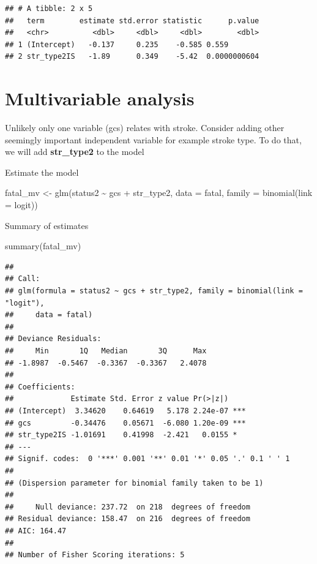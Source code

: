 \documentclass[
]{book}
\makeatletter
\newenvironment{Shaded}{\begin{snugshade}}{\end{snugshade}}
\newcommand{\AttributeTok}[1]{\textcolor[rgb]{0.61,0.61,0.61}{#1}}
\newcommand{\FunctionTok}[1]{\textcolor[rgb]{0,0,0}{#1}}
\newcommand{\NormalTok}[1]{#1}
\newcommand{\OtherTok}[1]{\textcolor[rgb]{0.37,0.37,0.37}{#1}}
\newcommand{\SpecialCharTok}[1]{\textcolor[rgb]{0,0,0}{#1}}
\newcommand{\StringTok}[1]{\textcolor[rgb]{0.5,0.5,0.5}{#1}}
\newenvironment{kframe}{%
\medskip{}
\setlength{\fboxsep}{.8em}
 \def\at@end@of@kframe{}%
 \ifinner\ifhmode%
  \def\at@end@of@kframe{\end{minipage}}%
  \begin{minipage}{\columnwidth}%
 \fi\fi%
 \def\FrameCommand##1{\hskip\@totalleftmargin \hskip-\fboxsep
 \colorbox{shadecolor}{##1}\hskip-\fboxsep
     \hskip-\linewidth \hskip-\@totalleftmargin \hskip\columnwidth}%
 \MakeFramed {\advance\hsize-\width
   \@totalleftmargin\z@ \linewidth\hsize
   \@setminipage}}%
 {\par\unskip\endMakeFramed%
 \at@end@of@kframe}
\renewenvironment{Shaded}{\begin{kframe}}{\end{kframe}}
\makeatother
\begin{document}
\begin{verbatim}
## # A tibble: 2 x 5
##   term        estimate std.error statistic      p.value
##   <chr>          <dbl>     <dbl>     <dbl>        <dbl>
## 1 (Intercept)   -0.137     0.235    -0.585 0.559       
## 2 str_type2IS   -1.89      0.349    -5.42  0.0000000604
\end{verbatim}

\hypertarget{multivariable-analysis}{%
\section{Multivariable analysis}\label{multivariable-analysis}}

Unlikely only one variable (gcs) relates with stroke. Consider adding other seemingly important independent variable for example stroke type. To do that, we will add \textbf{str\_type2} to the model

Estimate the model

\begin{Shaded}
\begin{Highlighting}[]
\NormalTok{fatal\_mv }\OtherTok{\textless{}{-}} \FunctionTok{glm}\NormalTok{(status2 }\SpecialCharTok{\textasciitilde{}}\NormalTok{ gcs }\SpecialCharTok{+}\NormalTok{ str\_type2, }\AttributeTok{data =}\NormalTok{ fatal,}
                    \AttributeTok{family =} \FunctionTok{binomial}\NormalTok{(}\AttributeTok{link =} \StringTok{\textquotesingle{}logit\textquotesingle{}}\NormalTok{))}
\end{Highlighting}
\end{Shaded}

Summary of estimates

\begin{Shaded}
\begin{Highlighting}[]
\FunctionTok{summary}\NormalTok{(fatal\_mv)}
\end{Highlighting}
\end{Shaded}

\begin{verbatim}
## 
## Call:
## glm(formula = status2 ~ gcs + str_type2, family = binomial(link = "logit"), 
##     data = fatal)
## 
## Deviance Residuals: 
##     Min       1Q   Median       3Q      Max  
## -1.8987  -0.5467  -0.3367  -0.3367   2.4078  
## 
## Coefficients:
##             Estimate Std. Error z value Pr(>|z|)    
## (Intercept)  3.34620    0.64619   5.178 2.24e-07 ***
## gcs         -0.34476    0.05671  -6.080 1.20e-09 ***
## str_type2IS -1.01691    0.41998  -2.421   0.0155 *  
## ---
## Signif. codes:  0 '***' 0.001 '**' 0.01 '*' 0.05 '.' 0.1 ' ' 1
## 
## (Dispersion parameter for binomial family taken to be 1)
## 
##     Null deviance: 237.72  on 218  degrees of freedom
## Residual deviance: 158.47  on 216  degrees of freedom
## AIC: 164.47
## 
## Number of Fisher Scoring iterations: 5
\end{verbatim}
\end{document}
